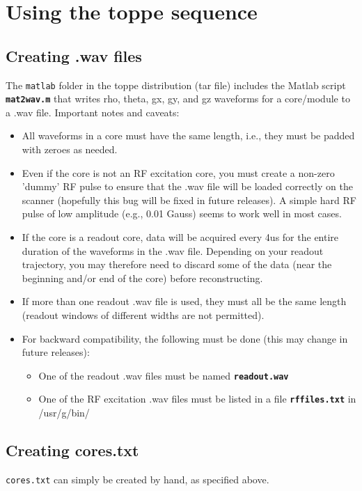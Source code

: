 
\chapter{Using the toppe sequence}

\section{Creating .wav files}
The {\tt matlab} folder in the toppe distribution (tar file) includes the Matlab script {\tt \bf mat2wav.m} that writes rho, theta, gx, gy, and gz waveforms for a core/module to a .wav file.
Important notes and caveats:
\begin{itemize}
\item All waveforms in a core must have the same length, i.e., they must be padded with zeroes as needed.
\item Even if the core is not an RF excitation core, you must create a non-zero 'dummy' RF pulse to ensure that the .wav file will be loaded correctly on the scanner (hopefully this bug will be fixed in future releases). A simple hard RF pulse of low amplitude (e.g., 0.01 Gauss) seems to work well in most cases.
\item If the core is a readout core, data will be acquired every 4us for the entire duration of the waveforms in the .wav file. Depending on your readout trajectory, you may therefore need to discard some of the data (near the beginning and/or end of the core) before reconstructing.
\item If more than one readout .wav file is used, they must all be the same length (readout windows of different widths are not permitted).
\item For backward compatibility, the following must be done (this may change in future releases):
\begin{itemize}
	\item One of the readout .wav files must be named {\tt \bf readout.wav} 
	\item One of the RF excitation .wav files must be listed in a file {\tt \bf rffiles.txt} in /usr/g/bin/ 
\end{itemize}
\end{itemize}


\section{Creating cores.txt}
{\tt cores.txt} can simply be created by hand, as specified above.


